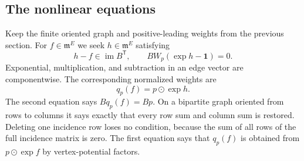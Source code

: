 \documentclass[11pt,a4paper]{article}
\numberwithin{equation}{section}
\theoremstyle{definition}
\newcommand{\mm}{\mathfrak m}
\newcommand{\im}{\operatorname{im}}
\newcommand{\od}{\mathbin{\odot}}
\begin{document}
\subsection{The nonlinear equations}
Keep the finite oriented graph and positive-leading weights from the
previous section. For $f\in\mm^E$ we seek $h\in\mm^E$ satisfying
\begin{equation}\label{scale:eq:normalizingeqs}
 h-f\in\im B^{\mathsf T},\qquad
 BW_p(\exp h-\mathbf1)=0.
\end{equation}
Exponential, multiplication, and subtraction in an edge vector are
componentwise. The corresponding normalized weights are
\begin{equation}\label{scale:eq:qdef}
 q_p(f)=p\od\exp h.
\end{equation}
The second equation says $Bq_p(f)=Bp$. On a bipartite graph oriented
from rows to columns it says exactly that every row sum and column
sum is restored. Deleting one incidence row loses no condition,
because the sum of all rows of the full incidence matrix is zero.
The first equation says that $q_p(f)$ is obtained from
$p\od\exp f$ by vertex-potential factors.
\end{document}
